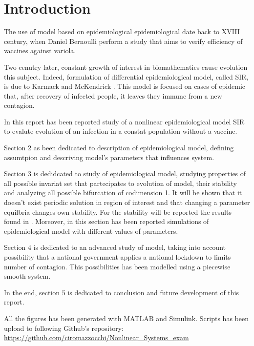 \section{Introduction}
The use of model based on epidemiological epidemiological date back to XVIII century, when Daniel Bernoulli perform a study that aims to verify efficiency of vaccines against variola.

Two cenutry later, constant growth of interest in biomathematics cause evolution this subject. Indeed, formulation of differential epidemiological model, called SIR, is due to Karmack and McKendrick \cite{bib:kermack_mckendrick}. This model is focused on cases of epidemic that, after recovery of infected people, it leaves they immune from a new contagion.

In this report has been reported study of a nonlinear epidemiological model SIR to evalute evolution of an infection in a constat population without a vaccine.

Section 2 as been dedicated to description of epidemiological model, defining assumtpion and descriving model's parameters that influences system.

Section 3 is dedidcated to study of epidemiological model, studying properties of all possible invariat set that partecipates to evolution of model, their stability and analyzing all possible bifurcation of codimension 1. It will be shown that it doesn't exist periodic solution in region of interest and that changing a parameter equilbria changes own stability. For the stability will be reported the results found in \cite{bib:sir_stability}. Moreover, in this section has been reported simulations of epidemiological model with different values of parameters.

Section 4 is dedicated to an advanced study of model, taking into account possibility that a national government applies a national lockdown to limits number of contagion. This possibilities has been modelled using a piecewise smooth system.

In the end, section 5 is dedicated to conclusion and future development of this report.

All the figures has been generated with MATLAB and Simulink. Scripts has been upload to following Github's repository: \url{https://github.com/ciromazzocchi/Nonlinear_Systems_exam}
